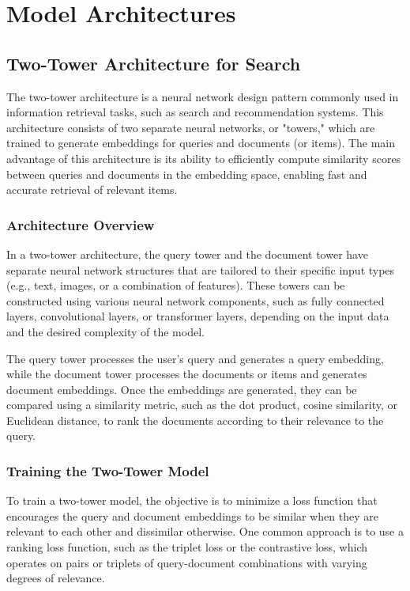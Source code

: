\documentclass[12pt]{article}
\begin{document}
\section{Model Architectures}

\subsection{Two-Tower Architecture for Search}

The two-tower architecture is a neural network design pattern commonly used in information retrieval tasks, such as search and recommendation systems. This architecture consists of two separate neural networks, or "towers," which are trained to generate embeddings for queries and documents (or items). The main advantage of this architecture is its ability to efficiently compute similarity scores between queries and documents in the embedding space, enabling fast and accurate retrieval of relevant items.

\subsubsection{Architecture Overview}

In a two-tower architecture, the query tower and the document tower have separate neural network structures that are tailored to their specific input types (e.g., text, images, or a combination of features). These towers can be constructed using various neural network components, such as fully connected layers, convolutional layers, or transformer layers, depending on the input data and the desired complexity of the model.

The query tower processes the user's query and generates a query embedding, while the document tower processes the documents or items and generates document embeddings. Once the embeddings are generated, they can be compared using a similarity metric, such as the dot product, cosine similarity, or Euclidean distance, to rank the documents according to their relevance to the query.

\subsubsection{Training the Two-Tower Model}

To train a two-tower model, the objective is to minimize a loss function that encourages the query and document embeddings to be similar when they are relevant to each other and dissimilar otherwise. One common approach is to use a ranking loss function, such as the triplet loss or the contrastive loss, which operates on pairs or triplets of query-document combinations with varying degrees of relevance.
\end{document}
